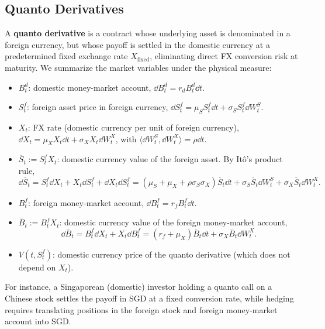 \subsection*{Quanto Derivatives}

A \textbf{quanto derivative} is a contract whose underlying asset is denominated in a foreign currency, but whose payoff is settled in the domestic currency at a predetermined fixed exchange rate $X_{\text{fixed}}$, eliminating direct FX conversion risk at maturity. We summarize the market variables under the physical measure:
\begin{itemize}
    \item $B_t^d$: domestic money-market account, $\dd B_t^d = r_d B_t^d \dd t$.
    \item $S_t^f$: foreign asset price in foreign currency, $\dd S_t^f = \mu_S S_t^f \dd t + \sigma_S S_t^f \dd W_t^S$.
    \item $X_t$: FX rate (domestic currency per unit of foreign currency), $\dd X_t = \mu_X X_t \dd t + \sigma_X X_t \dd W_t^X$, with $\langle \dd W_t^S, \dd W_t^X \rangle = \rho \dd t$.
    \item $\overline{S}_t := S_t^f X_t$: domestic currency value of the foreign asset. By It\^{o}'s product rule,
    \[
    \dd\overline{S}_t = S_t^f \dd X_t + X_t \dd S_t^f + \dd X_t \dd S_t^f = (\mu_S + \mu_X + \rho\sigma_S\sigma_X)\overline{S}_t \dd t + \sigma_S\overline{S}_t \dd W_t^S + \sigma_X\overline{S}_t \dd W_t^X.
    \]
    \item $B_t^f$: foreign money-market account, $\dd B_t^f = r_f B_t^f \dd t$.
    \item $\overline{B}_t := B_t^f X_t$: domestic currency value of the foreign money-market account,
    \[
    \dd\overline{B}_t = B_t^f \dd X_t + X_t \dd B_t^f = (r_f + \mu_X)\overline{B}_t \dd t + \sigma_X\overline{B}_t \dd W_t^X.
    \]
    \item $V(t, S_t^f)$: domestic currency price of the quanto derivative (which does not depend on $X_t$).
\end{itemize}
For instance, a Singaporean (domestic) investor holding a quanto call on a Chinese stock settles the payoff in SGD at a fixed conversion rate, while hedging requires translating positions in the foreign stock and foreign money-market account into SGD.

